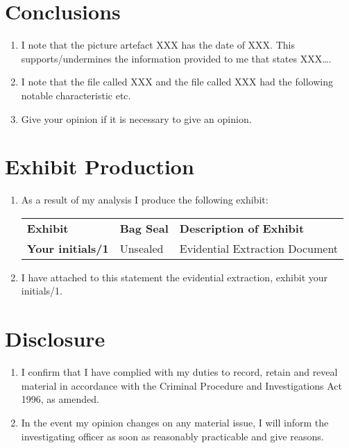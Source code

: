 \documentclass[11pt]{article}
\begin{document}
\section*{Conclusions}
\begin{enumerate}[resume]
    \item I note that the picture artefact XXX has the date of XXX. This supports/undermines the information provided to me that states XXX….
    \item I note that the file called XXX and the file called XXX had the following notable characteristic etc.
    \item Give your opinion if it is necessary to give an opinion.
\end{enumerate}

\section*{Exhibit Production}
\begin{enumerate}[resume]
    \item As a result of my analysis I produce the following exhibit:

    \begin{tabular}{lll}
    \textbf{Exhibit} & \textbf{Bag Seal} & \textbf{Description of Exhibit} \\
    \textbf{Your initials/1} & Unsealed & Evidential Extraction Document \\
    \end{tabular}

    \item I have attached to this statement the evidential extraction, exhibit your initials/1.
\end{enumerate}

\section*{Disclosure}
\begin{enumerate}[resume]
    \item I confirm that I have complied with my duties to record, retain and reveal material in accordance with the Criminal Procedure and Investigations Act 1996, as amended.
    \item In the event my opinion changes on any material issue, I will inform the investigating officer as soon as reasonably practicable and give reasons.
\end{enumerate}
\end{document}
